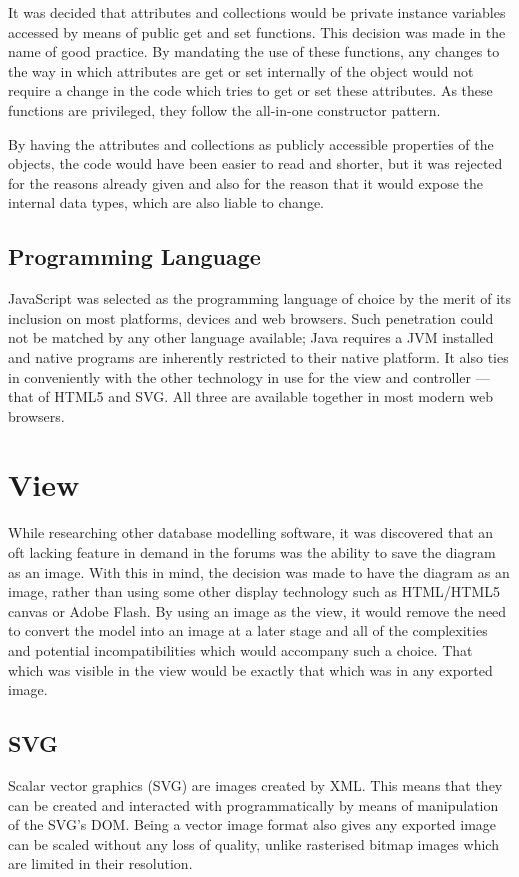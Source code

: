 It was decided that attributes and collections would be private instance variables accessed by means of public get and set functions. This decision was made in the name of good practice. By mandating the use of these functions, any changes to the way in which attributes are get or set internally of the object would not require a change in the code which tries to get or set these attributes. As these functions are privileged, they follow the all-in-one constructor pattern.

By having the attributes and collections as publicly accessible properties of the objects, the code would have been easier to read and shorter, but it was rejected for the reasons already given and also for the reason that it would expose the internal data types, which are also liable to change.

\subsection{Programming Language}
JavaScript was selected as the programming language of choice by the merit of its inclusion on most platforms, devices and web browsers. Such penetration could not be matched by any other language available; Java requires a JVM installed and native programs are inherently restricted to their native platform. It also ties in conveniently with the other technology in use for the view and controller --- that of HTML5 and SVG. All three are available together in most modern web browsers.

\section{View}
While researching other database modelling software, it was discovered that an oft lacking feature in demand in the forums was the ability to save the diagram as an image. With this in mind, the decision was made to have the diagram as an image, rather than using some other display technology such as HTML\slash HTML5 canvas or Adobe Flash. By using an image as the view, it would remove the need to convert the model into an image at a later stage and all of the complexities and potential incompatibilities which would accompany such a choice. That which was visible in the view would be exactly that which was in any exported image.

\subsection{SVG}
Scalar vector graphics (SVG) are images created by XML. This means that they can be created and interacted with programmatically by means of manipulation of the SVG's DOM. Being a vector image format also gives any exported image can be scaled without any loss of quality, unlike rasterised bitmap images which are limited in their resolution.

